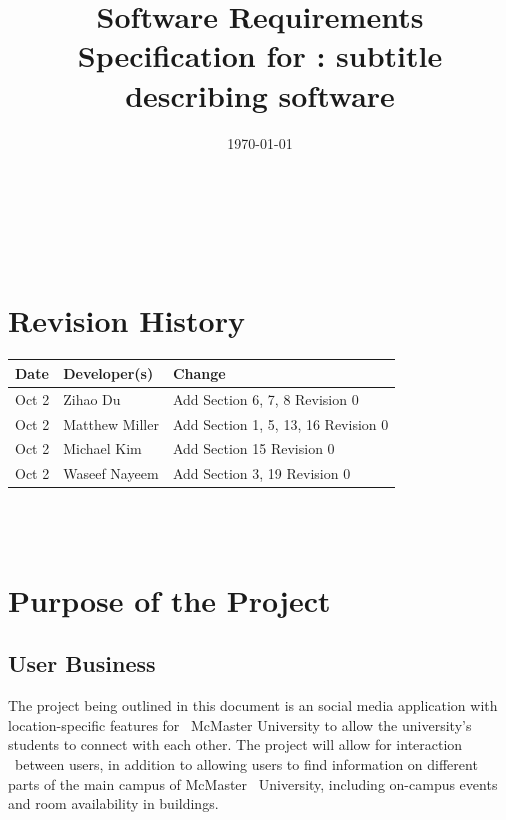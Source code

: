 \documentclass[12pt]{article}
\begin{document}
\title{Software Requirements Specification for \progname: subtitle describing software} 
\author{\authname}
\date{\today}
	
\maketitle

~\newpage


\tableofcontents

~\newpage

\section*{Revision History}

\begin{tabularx}{\textwidth}{p{3cm}p{3cm}X}
\toprule {\textbf{Date}} & {\textbf{Developer(s)}} & {\textbf{Change}}\\
\midrule
Oct 2 & Zihao Du & Add Section 6, 7, 8 Revision 0\\
Oct 2 & Matthew Miller & Add Section 1, 5, 13, 16 Revision 0\\
Oct 2 & Michael Kim & Add Section 15 Revision 0\\
Oct 2 & Waseef Nayeem & Add Section 3, 19 Revision 0\\
\bottomrule
\end{tabularx}

~\\

~\newpage
\section{Purpose of the Project}
\subsection{User Business}
\quad The project being outlined in this document is an social media application with location-specific features for \
McMaster University to allow the university's students to connect with each other. The project will allow for interaction \
between users, in addition to allowing users to find information on different parts of the main campus of McMaster \
University, including on-campus events and room availability in buildings.
\end{document}
